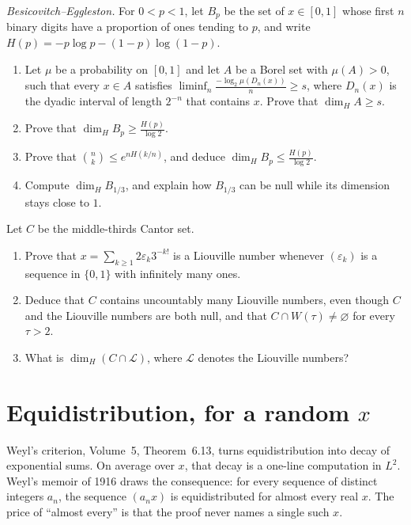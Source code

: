 \begin{exercise}[$\star\star\star$]\label{pb:eggleston}
\emph{Besicovitch--Eggleston.} For $0<p<1$, let $B_p$ be the set of $x\in[0,1]$ whose first $n$ binary digits have a proportion of ones tending to $p$, and write $H(p)=-p\log p-(1-p)\log(1-p)$.
\begin{enumerate}[label=(\alph*)]
\item Let $\mu$ be a probability on $[0,1]$ and let $A$ be a Borel set with $\mu(A)>0$, such that every $x\in A$ satisfies $\liminf_n\frac{-\log_2\mu(D_n(x))}n\ge s$, where $D_n(x)$ is the dyadic interval of length $2^{-n}$ that contains $x$. Prove that $\dim_HA\ge s$.
\item Prove that $\dim_HB_p\ge\frac{H(p)}{\log2}$.
\item Prove that $\binom nk\le e^{nH(k/n)}$, and deduce $\dim_HB_p\le\frac{H(p)}{\log2}$.
\item Compute $\dim_HB_{1/3}$, and explain how $B_{1/3}$ can be null while its dimension stays close to $1$.
\end{enumerate}
\end{exercise}

\begin{exercise}[$\star$]\label{pb:cantorL}
Let $C$ be the middle-thirds Cantor set.
\begin{enumerate}[label=(\alph*)]
\item Prove that $x=\sum_{k\ge1}2\varepsilon_k3^{-k!}$ is a Liouville number whenever $(\varepsilon_k)$ is a sequence in $\{0,1\}$ with infinitely many ones.
\item Deduce that $C$ contains uncountably many Liouville numbers, even though $C$ and the Liouville numbers are both null, and that $C\cap W(\tau)\ne\varnothing$ for every $\tau>2$.
\item What is $\dim_H(C\cap\mathcal L)$, where $\mathcal L$ denotes the Liouville numbers?
\end{enumerate}
\end{exercise}

\section{Equidistribution, for a random \texorpdfstring{$x$}{x}}

Weyl's criterion, Volume~5, Theorem~6.13, turns equidistribution into decay of exponential sums. On average over $x$, that decay is a one-line computation in $L^2$. Weyl's memoir of 1916 draws the consequence: for every sequence of distinct integers $a_n$, the sequence $(a_nx)$ is equidistributed for almost every real $x$. The price of ``almost every'' is that the proof never names a single such $x$.


